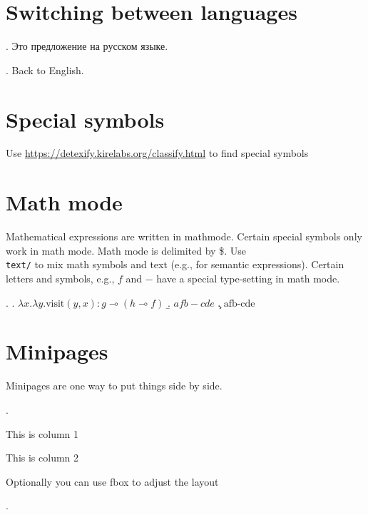 \section{Switching between languages}


\ex. Это предложение на русском языке.


\ex. Back to English.

\section{Special symbols}

Use \url{https://detexify.kirelabs.org/classify.html} to find special symbols

\section{Math mode}

Mathematical expressions are written in mathmode. Certain special symbols only work in math mode. Math mode is delimited by \$. Use \texttt{\\text/} to mix math symbols and text (e.g., for semantic expressions). Certain letters and symbols, e.g., $f$ and $-$ have a special type-setting in math mode.

\ex. \a. $\lambda x. \lambda y.\text{visit}(y,x): g \multimap (h \multimap f)$
\b. $afb-cde$
\c. $\text{afb-cde}$

\section{Minipages}

Minipages are one way to put things side by side.

\ex. \begin{minipage}[t]{.5\textwidth}
  This is column 1  
\end{minipage}%
\begin{minipage}[t]{.5\textwidth}
    This is column 2
\end{minipage}

Optionally you can use fbox to adjust the layout 

\ex. %

